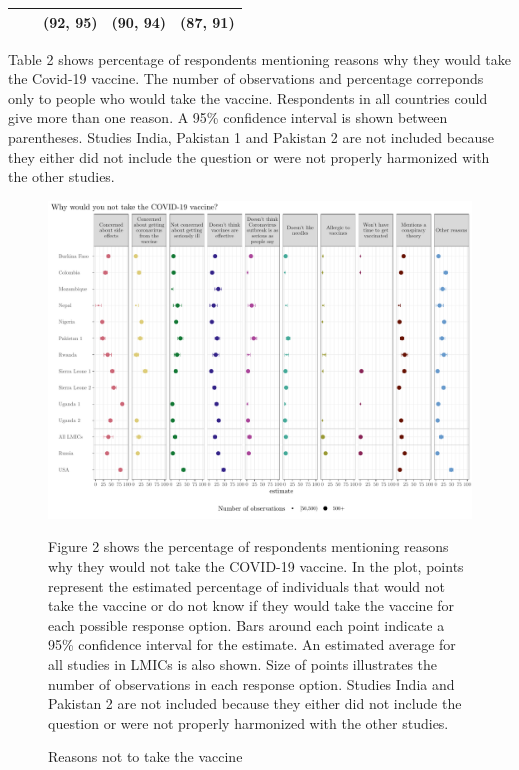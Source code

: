 \documentclass[
  12pt,
]{article}
\begin{document}
\begin{table}
\begin{threeparttable}
\begin{tabular}[t]{>{\raggedright\arraybackslash}p{8em}>{\centering\arraybackslash}p{4em}>{\centering\arraybackslash}p{4em}>{\centering\arraybackslash}p{4em}c}
 &  & (92, 95) & (90, 94) & (87, 91)\\
\bottomrule
\end{tabular}
\begin{tablenotes}
\item Table 2 shows percentage of respondents mentioning reasons why they would take the Covid-19 vaccine. The number of observations and percentage correponds only to people who would take the vaccine. Respondents in all countries could give more than one reason. A 95\% confidence interval is shown between parentheses. Studies India, Pakistan 1 and Pakistan 2 are not included because they either did not include the question or were not properly harmonized with the other studies.
\end{tablenotes}
\end{threeparttable}
\end{table}

\begin{figure}[!ht]
\caption{Reasons not to take the vaccine \label{fig:fig2paper}}

\includegraphics{paper_files/figure-latex/fig2paper-1.pdf}

\scriptsize{Figure 2 shows the percentage of respondents mentioning reasons why they would not take the COVID-19 vaccine. In the plot, points represent the estimated percentage of individuals that would not take the vaccine or do not know if they would take the vaccine for each possible response option. Bars around each point indicate a 95\% confidence interval for the estimate. An estimated average for all studies in LMICs is also shown. Size of points illustrates the number of observations in each response option. Studies India and Pakistan 2 are not included because they either did not include the question or were not properly harmonized with the other studies.}
\end{figure}
\end{document}
